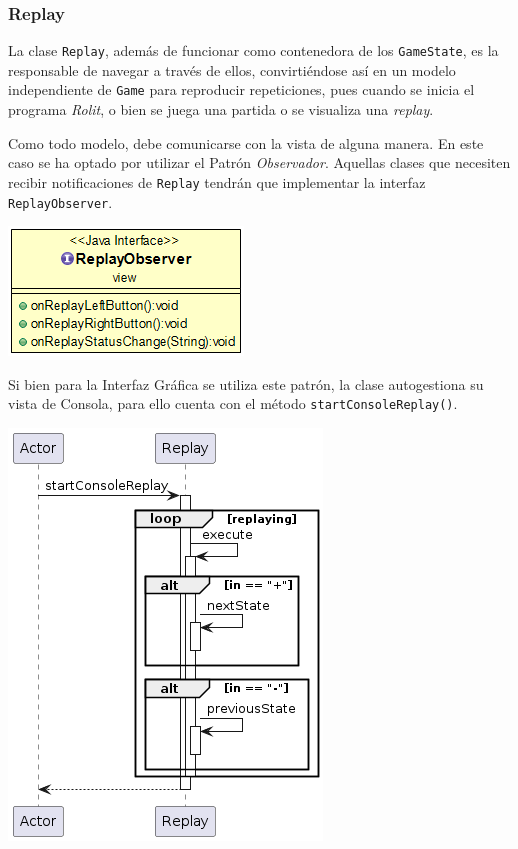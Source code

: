 \documentclass[12pt,a4paper,openright]{book}
\theoremstyle{break}
\begin{document}
\subsubsection{Replay}
La clase \texttt{Replay}, además de funcionar como contenedora de los \texttt{GameState}, es la responsable de navegar a través de ellos, convirtiéndose así en un modelo independiente de \texttt{Game} para reproducir repeticiones, pues cuando se inicia el programa \textit{Rolit}, o bien se juega una partida o se visualiza una \textit{replay}.

Como todo modelo, debe comunicarse con la vista de alguna manera. En este caso se ha optado por utilizar el Patrón \textit{Observador}. Aquellas clases que necesiten recibir notificaciones de \texttt{Replay} tendrán que implementar la interfaz \texttt{ReplayObserver}.

\begin{center}
\includegraphics[scale=0.5]{rolit-observer-sprint4.png}
\end{center}


Si bien para la Interfaz Gráfica se utiliza este patrón, la clase autogestiona su vista de Consola, para ello cuenta con el método \texttt{startConsoleReplay()}.

\begin{center}
\includegraphics[scale=0.7]{vistareplay.png}
\end{center}
\end{document}
